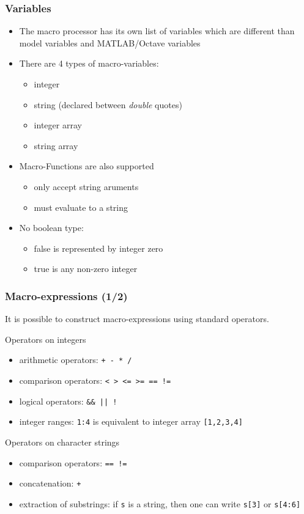 \documentclass{beamer}
\begin{document}
\begin{frame}
\frametitle{Variables}
\begin{itemize}
\item The macro processor has its own list of variables which are different than model variables and MATLAB/Octave variables
\item There are 4 types of macro-variables:
  \begin{itemize}
  \item integer
  \item string (declared between \textit{double} quotes)
  \item integer array
  \item string array
  \end{itemize}
\item Macro-Functions are also supported
  \begin{itemize}
  \item only accept string aruments
  \item must evaluate to a string
  \end{itemize}
\item No boolean type:
  \begin{itemize}
  \item false is represented by integer zero
  \item true is any non-zero integer
  \end{itemize}
\end{itemize}
\end{frame}

\begin{frame}[fragile=singleslide]
  \frametitle{Macro-expressions (1/2)}
  It is possible to construct macro-expressions using standard operators.
  \begin{block}{Operators on integers}
    \begin{itemize}
    \item arithmetic operators: \texttt{+ - * /}
    \item comparison operators: \texttt{< > <= >= == !=}
    \item logical operators: \verb+&& || !+
    \item integer ranges: \texttt{1:4} is equivalent to integer array \texttt{[1,2,3,4]}
    \end{itemize}
  \end{block}

  \begin{block}{Operators on character strings}
    \begin{itemize}
    \item comparison operators: \texttt{== !=}
    \item concatenation: \texttt{+}
    \item extraction of substrings: if \texttt{s} is a string, then one can write \texttt{s[3]} or \texttt{s[4:6]}
    \end{itemize}
  \end{block}
\end{frame}
\end{document}
